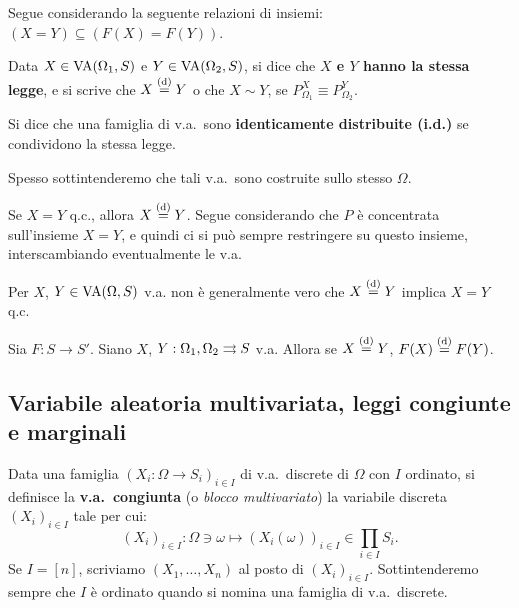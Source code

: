 \begin{multicols*}{2}
\begin{proposition}
    Segue considerando la seguente relazioni di insiemi: $(X = Y) \subseteq (F(X) = F(Y))$.
\end{proposition}

\begin{definition}
    Data $X \in \operatorname{VA}(\Omega_1, S)$ e $Y \in \operatorname{VA}(\Omega_2, S)$,
    si dice che \textbf{$X$ e $Y$ hanno la stessa legge},
    e si scrive che $X \overset{\mathrm{(d)}}{=} Y$ o che $X \sim Y$, se
    $P_{\Omega_1}^X \equiv P_{\Omega_2}^Y$.
\end{definition}

\begin{definition}
    Si dice che una famiglia di v.a.~sono \textbf{identicamente distribuite (i.d.)}
    se condividono la stessa legge. \smallskip


    Spesso sottintenderemo che tali v.a.~sono costruite sullo stesso $\Omega$.
\end{definition}

\begin{proposition}
    Se $X = Y$ q.c., allora $X \overset{\mathrm{(d)}}{=} Y$. Segue considerando che
    $P$ è concentrata sull'insieme $X=Y$, e quindi ci si può sempre
    restringere su questo insieme, interscambiando eventualmente
    le v.a.
\end{proposition}

\begin{remark}
    Per $X$, $Y \in \operatorname{VA}(\Omega, S)$ v.a. non è generalmente vero che
    $X \overset{\mathrm{(d)}}{=} Y$ implica $X = Y$ q.c. 
\end{remark}

\begin{proposition}
    Sia $F : S \to S'$. Siano $X$, $Y : \Omega_1, \Omega_2 \rightrightarrows S$ v.a. Allora
    se $X \overset{\mathrm{(d)}}{=} Y$, $F(X) \overset{\mathrm{(d)}}{=} F(Y)$.
\end{proposition}

\subsection{Variabile aleatoria multivariata, leggi congiunte e marginali}

\begin{definition}
    Data una famiglia $(X_i : \Omega \to S_i)_{i \in I}$ di
    v.a.~discrete di $\Omega$ con $I$ ordinato, si definisce la \textbf{v.a.~congiunta} (o
    \textit{blocco multivariato}) la variabile discreta $(X_i)_{i \in I}$ tale per cui:
    \[
        (X_i)_{i \in I} : \Omega \ni \omega \mapsto (X_i(\omega))_{i \in I} \in \prod_{i \in I} S_i.
    \]
    Se $I = [n]$, scriviamo $(X_1, \ldots, X_n)$ al posto di $(X_i)_{i \in I}$.
    Sottintenderemo sempre che $I$ è ordinato quando si nomina una famiglia
    di v.a.~discrete.
\end{definition}


\end{multicols*}
